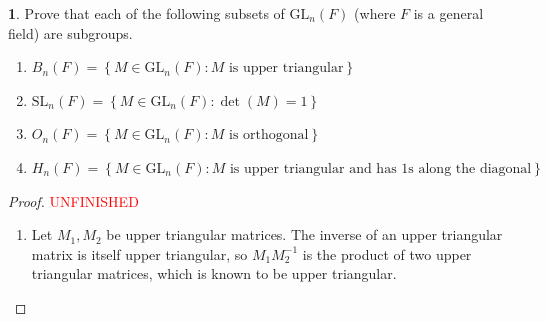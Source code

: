 \documentclass[12pt]{article}
\theoremstyle{definition}
\newtheorem{ex}{}
\begin{document}
\begin{ex}
	Prove that each of the following subsets of $\mathrm{GL}_n(F)$ (where $F$ is a general field) are subgroups.
	\begin{enumerate}[label=(\alph*)]
		\item $B_n(F) = \left\lbrace M \in \mathrm{GL}_n(F) : M \text{ is upper triangular} \right\rbrace$
		\item $\mathrm{SL}_n(F) = \left\lbrace M \in \mathrm{GL}_n(F) : \det(M) = 1 \right\rbrace$
		\item $O_n(F) = \left\lbrace M \in \mathrm{GL}_n(F) : M \text{ is orthogonal} \right\rbrace$
		\item $H_n(F) = \left\lbrace M \in \mathrm{GL}_n(F) : M \text{ is upper triangular and has 1s along the diagonal} \right\rbrace$
	\end{enumerate}
\end{ex}
\begin{proof}
	\textcolor{red}{UNFINISHED}
	\begin{enumerate}[label=(\alph*)]
		\item Let $M_1, M_2$ be upper triangular matrices.
      The inverse of an upper triangular matrix is itself upper triangular, so $M_1M_2^{-1}$ is the product of two upper triangular matrices, which is known to be upper triangular.
	\end{enumerate}
\end{proof}
\end{document}
